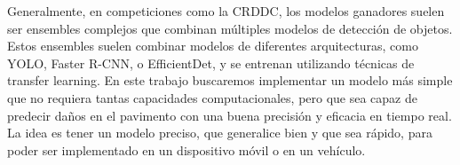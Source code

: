 Generalmente, en competiciones como la CRDDC, los modelos ganadores suelen ser ensembles complejos que combinan múltiples modelos de detección de objetos. Estos ensembles suelen combinar modelos de diferentes arquitecturas, como YOLO, Faster R-CNN, o EfficientDet, y se entrenan utilizando técnicas de transfer learning. En este trabajo buscaremos implementar un modelo más simple que no requiera tantas capacidades computacionales, pero que sea capaz de predecir daños en el pavimento con una buena precisión y eficacia en tiempo real. La idea es tener un modelo preciso, que generalice bien y que sea rápido, para poder ser implementado en un dispositivo móvil o en un vehículo.

